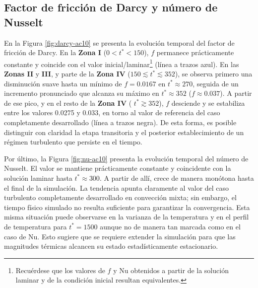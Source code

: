 \subsection{Factor de fricción de Darcy y número de Nusselt}
En la Figura \ref{fig:darcy-ac10} se presenta la evolución temporal del factor de fricción de Darcy. En la \textbf{Zona I} ($0 < t^* < 150$), $f$ permanece prácticamente constante y coincide con el \linebreak valor inicial/laminar\footnote{Recuérdese que los valores de $f$ y Nu obtenidos a partir de la solución laminar y de la condición inicial resultan equivalentes.} (línea a trazos azul). En las \textbf{Zonas II} y \textbf{III}, y parte de la \textbf{Zona IV} ($150 \lesssim t^* \lesssim 352 $), se observa primero una disminución suave hasta un mínimo de $f=0\text{.}0167$ en $t^*\approx270$, seguida de un incremento pronunciado que alcanza su máximo en $t^*\approx352$ ($f \approx 0\text{.}037$). A partir de ese pico, y en el resto de la \textbf{Zona IV} ( $t^*\gtrsim352$), $f$ desciende y se estabiliza entre los valores 0.0275 y 0.033, en torno al valor de referencia del caso completamente desarrollado (línea a trazos negra). De esta forma, es posible distinguir con claridad la etapa transitoria y el posterior establecimiento de un régimen turbulento que persiste en el tiempo.

Por último, la Figura \ref{fig:nu-ac10} presenta la evolución temporal del número de Nusselt. El valor se mantiene prácticamente constante y coincidente con la solución laminar hasta $t^* \approx 300$. A partir de allí, crece de manera monótona hasta el final de la simulación. La tendencia apunta claramente al valor del caso turbulento completamente desarrollado en convección mixta; sin embargo, el tiempo físico simulado no resulta suficiente para garantizar la convergencia. Esta misma situación puede observarse en la varianza de la temperatura y en el perfil de temperatura para $t^*=1500$ aunque no de manera tan marcada como en el caso de Nu. Esto sugiere que se requiere extender la simulación para que las magnitudes térmicas alcancen su estado estadísticamente estacionario.

